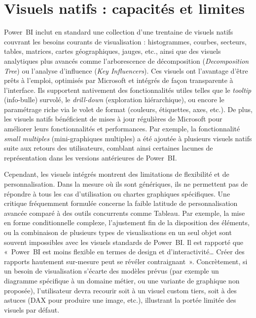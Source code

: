 \section{Visuels natifs : capacités et limites}
\label{sec:visuels-natifs}

Power~BI inclut en standard une collection d’une trentaine de visuels natifs couvrant les besoins courants de visualisation : histogrammes, courbes, secteurs, tables, matrices, cartes géographiques, jauges, etc., ainsi que des visuels analytiques plus avancés comme l’arborescence de décomposition (\textit{Decomposition Tree}) ou l’analyse d’influence (\textit{Key Influencers}).  
Ces visuels ont l’avantage d’être prêts à l’emploi, optimisés par Microsoft et intégrés de façon transparente à l’interface.  
Ils supportent nativement des fonctionnalités utiles telles que le \textit{tooltip} (info-bulle) survolé, le \textit{drill-down} (exploration hiérarchique), ou encore le paramétrage riche via le volet de format (couleurs, étiquettes, axes, etc.).  
De plus, les visuels natifs bénéficient de mises à jour régulières de Microsoft pour améliorer leurs fonctionnalités et performances.  
Par exemple, la fonctionnalité \textit{small multiples} (mini-graphiques multiples) a été ajoutée à plusieurs visuels natifs suite aux retours des utilisateurs, comblant ainsi certaines lacunes de représentation dans les versions antérieures de Power~BI.

Cependant, les visuels intégrés montrent des limitations de flexibilité et de personnalisation.  
Dans la mesure où ils sont génériques, ils ne permettent pas de répondre à tous les cas d’utilisation ou chartes graphiques spécifiques.  
Une critique fréquemment formulée concerne la faible latitude de personnalisation avancée comparé à des outils concurrents comme Tableau\parencite{FyndAcademyPBIvsTableau2024}.  
Par exemple, la mise en forme conditionnelle complexe, l’ajustement fin de la disposition des éléments, ou la combinaison de plusieurs types de visualisations en un seul objet sont souvent impossibles avec les visuels standards de Power~BI.  
Il est rapporté que «~Power~BI est moins flexible en termes de design et d’interactivité… Créer des rapports hautement sur-mesure peut se révéler contraignant~»\parencite{FyndAcademyPBIvsTableau2024}.  
Concrètement, si un besoin de visualisation s’écarte des modèles prévus (par exemple un diagramme spécifique à un domaine métier, ou une variante de graphique non proposée), l’utilisateur devra recourir soit à un visuel custom tiers, soit à des astuces (DAX pour produire une image, etc.), illustrant la portée limitée des visuels par défaut\parencite{FyndAcademyPBIvsTableau2024}.

